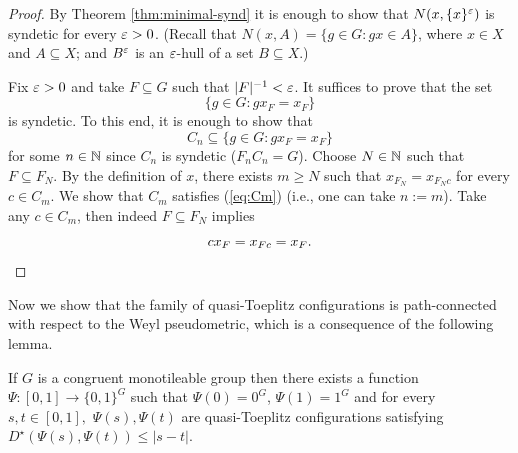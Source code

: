 \begin{proof}
By Theorem \ref{thm:minimal-synd} it is enough to show that $N(x,\{x\}^\varepsilon)$ is syndetic for every $\varepsilon>0$. (Recall that $N(x,A)=\{g\in G: gx\in A\}$, where $x\in X$ and $A\subseteq X$; and $B^\varepsilon$ is an $\varepsilon$-hull of a set $B\subseteq X$.)

Fix $\varepsilon>0$ and take $F\subseteq G$ such that $|F|^{-1}<\varepsilon$.
%
It suffices to prove that the set $$\{g\in G: g x_{F} = x_{F}\}$$ is syndetic. To this end, it is enough to show that  
\begin{equation}\label{eq:Cm}
C_n\subseteq \{g\in G: g x_{F} = x_{F}\}
\end{equation}
for some $n\in \mathbb{N}$ since $C_n$ is syndetic ($F_nC_n=G$).  Choose $N\in\mathbb{N}$ such that $F\subseteq F_N$. By the definition of $x$, there exists $m\geq N$ such that $x_{F_N} = x_{F_Nc}$ for every $c\in C_m$. We show that $C_m$ satisfies (\ref{eq:Cm}) (i.e., one can take $n:=m$). Take any $c\in C_m$, then indeed $F\subseteq F_N$ implies 
\[
c x_{F} = x_{Fc} =  x_{F}.\qedhere
\]
\end{proof}

\noindent
Now we show that the family of quasi-Toeplitz configurations is path-connected with respect to the Weyl pseudometric, which is a consequence of the following lemma.

\begin{lem}\label{lem:connected1}
If $G$ is a congruent monotileable group then there exists a function $\Psi\colon[0,1]\to\{0,1\}^G$ such that $\Psi(0)=0^G$, $\Psi(1)=1^G$ and for every $s,t\in[0,1],$ $\Psi(s),\Psi(t)$ are quasi-Toeplitz configurations satisfying $D^\star(\Psi(s),\Psi(t))\leq|s-t|$.
\end{lem}

